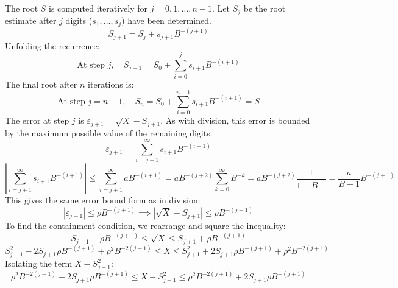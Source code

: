\documentclass{article}
\begin{document}
The root $S$ is computed iteratively for $j = 0, 1, \dots, n-1$.
Let $S_j$ be the root estimate after $j$ digits ($s_1, \dots, s_j$) have been determined.
\begin{equation}
  \label{eq:sqrt:root_recurrence}
  S_{j+1} = S_j + s_{j+1} B^{-(j+1)}
\end{equation}
Unfolding the recurrence:
\begin{equation}
  \label{eq:sqrt:root_unfold}
  \text{At step } j, \quad S_{j+1} = S_0 + \sum_{i=0}^{j} s_{i+1} B^{-(i+1)}
\end{equation}
The final root after $n$ iterations is:
\begin{equation}
  \label{eq:sqrt:root_final}
  \text{At step } j = n-1, \quad S_n = S_0 + \sum_{i=0}^{n-1} s_{i+1} B^{-(i+1)} = S
\end{equation}
The error at step $j$ is $\varepsilon_{j+1} = \sqrt{X} - S_{j+1}$.
As with division, this error is bounded by the maximum possible value of the remaining digits:
\begin{equation}
  \label{eq:sqrt:error_def}
  \varepsilon_{j+1} = \sum_{i=j+1}^{\infty} s_{i+1} B^{-(i+1)}
\end{equation}
\begin{equation}
  \label{eq:sqrt:error_sum}
  \left| \sum_{i=j+1}^{\infty} s_{i+1} B^{-(i+1)} \right| \leq \sum_{i=j+1}^{\infty} a B^{-(i+1)} = a B^{-(j+2)} \sum_{k=0}^{\infty} B^{-k} = a B^{-(j+2)} \frac{1}{1-B^{-1}} = \frac{a}{B-1} B^{-(j+1)}
\end{equation}
This gives the same error bound form as in division:
\begin{equation}
  \label{eq:sqrt:error_bound}
  \left| \varepsilon_{j+1} \right| \leq \rho B^{-(j+1)} \implies \left| \sqrt{X} - S_{j+1} \right| \leq \rho B^{-(j+1)}
\end{equation}
To find the containment condition, we rearrange and square the inequality:
\begin{equation}
  \label{eq:sqrt:error_rearrange}
  S_{j+1} - \rho B^{-(j+1)} \leq \sqrt{X} \leq S_{j+1} + \rho B^{-(j+1)}
\end{equation}
\begin{equation}
  \label{eq:sqrt:error_square}
  S_{j+1}^2 - 2 S_{j+1} \rho B^{-(j+1)} + \rho^2 B^{-2(j+1)} \leq X \leq S_{j+1}^2 + 2 S_{j+1} \rho B^{-(j+1)} + \rho^2 B^{-2(j+1)}
\end{equation}
Isolating the term $X - S_{j+1}^2$:
\begin{equation}
  \label{eq:sqrt:containment_pre}
  \rho^2 B^{-2(j+1)} - 2 S_{j+1} \rho B^{-(j+1)} \leq X - S_{j+1}^2 \leq \rho^2 B^{-2(j+1)} + 2 S_{j+1} \rho B^{-(j+1)}
\end{equation}
\end{document}
